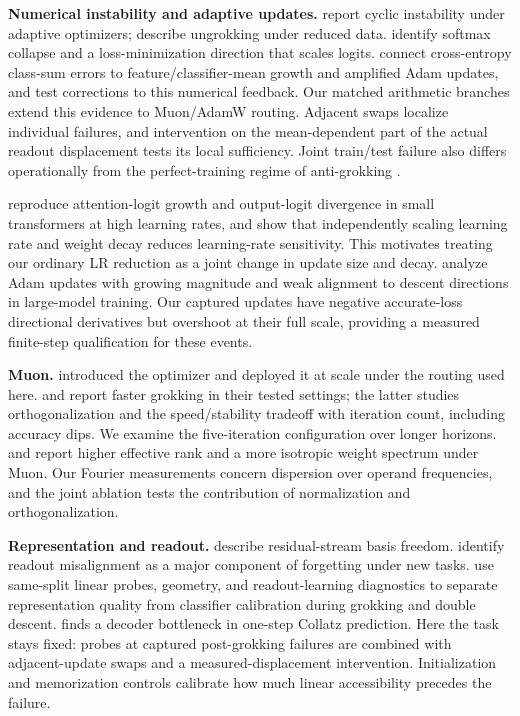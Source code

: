 \documentclass{article}
\begin{document}
\textbf{Numerical instability and adaptive updates.} \citet{thilak2022slingshot} report cyclic instability under adaptive optimizers; \citet{varma2023explaining} describe ungrokking under reduced data. \citet{prieto2025grokking} identify softmax collapse and a loss-minimization direction that scales logits. \citet{liu2026glitching} connect cross-entropy class-sum errors to feature/classifier-mean growth and amplified Adam updates, and test corrections to this numerical feedback. Our matched arithmetic branches extend this evidence to Muon/AdamW routing. Adjacent swaps localize individual failures, and intervention on the mean-dependent part of the actual readout displacement tests its local sufficiency. Joint train/test failure also differs operationally from the perfect-training regime of anti-grokking \citep{prakash2025grokking}.

\citet{wortsman2024smallscale} reproduce attention-logit growth and output-logit divergence in small transformers at high learning rates, and show that independently scaling learning rate and weight decay reduces learning-rate sensitivity. This motivates treating our ordinary LR reduction as a joint change in update size and decay. \citet{molybog2023adam} analyze Adam updates with growing magnitude and weak alignment to descent directions in large-model training. Our captured updates have negative accurate-loss directional derivatives but overshoot at their full scale, providing a measured finite-step qualification for these events.

\textbf{Muon.} \citet{jordan2024muon} introduced the optimizer and \citet{liu2025muon} deployed it at scale under the routing used here. \citet{tveit2025muon} and \citet{wang2026active} report faster grokking in their tested settings; the latter studies orthogonalization and the speed/stability tradeoff with iteration count, including accuracy dips. We examine the five-iteration configuration over longer horizons. \citet{ruan2026muon} and \citet{wang2025tailend} report higher effective rank and a more isotropic weight spectrum under Muon. Our Fourier measurements concern dispersion over operand frequencies, and the joint ablation tests the contribution of normalization and orthogonalization.

\textbf{Representation and readout.} \citet{elhage2021framework} describe residual-stream basis freedom. \citet{anthes2023diagnosing} identify readout misalignment as a major component of forgetting under new tasks. \citet{chou2026twospeeds} use same-split linear probes, geometry, and readout-learning diagnostics to separate representation quality from classifier calibration during grokking and double descent. \citet{gomezjurado2026longdelay} finds a decoder bottleneck in one-step Collatz prediction. Here the task stays fixed: probes at captured post-grokking failures are combined with adjacent-update swaps and a measured-displacement intervention. Initialization and memorization controls calibrate how much linear accessibility precedes the failure.
\end{document}
